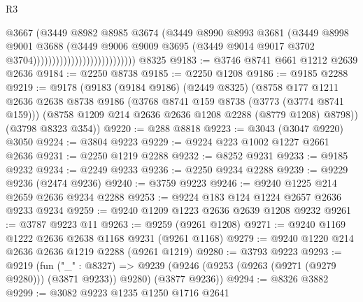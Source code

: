 \begin{lexlean}{R3}
\begin{coremodule}
                                                @3667
                                                (@3449
                                                  @8982
                                                  @8985
                                                  @3674
                                                  (@3449
                                                    @8990
                                                    @8993
                                                    @3681
                                                    (@3449
                                                      @8998
                                                      @9001
                                                      @3688
                                                      (@3449
                                                        @9006
                                                        @9009
                                                        @3695
                                                        (@3449
                                                          @9014
                                                          @9017
                                                          @3702
                                                          @3704)))))))))))))))))))))))))))
    @8325
@9183 := @3746 @8741 @661 @1212 @2639 @2636
@9184 := @2250 @8738
@9185 := @2250 @1208
@9186 := @9185 @2288
@9219 := @9178
    (@9183
      (@9184 @9186)
      (@2449 @8325)
      (@8758
        @177
        @1211
        @2636
        @2638
        @8738
        @9186
        (@3768 @8741 @159 @8738 (@3773 (@3774 @8741 @159)))
        (@8758 @1209 @214 @2636 @2636 @1208 @2288 (@8779 @1208) @8798))
      (@3798 @8323 @354))
@9220 := @288 @8818
@9223 := @3043 (@3047 @9220) @3050
@9224 := @3804 @9223
@9229 := @9224 @223 @1002 @1227 @2661 @2636
@9231 := @2250 @1219 @2288
@9232 := @8252 @9231
@9233 := @9185 @9232
@9234 := @2249 @9233
@9236 := @2250 @9234 @2288
@9239 := @9229 @9236 (@2474 @9236)
@9240 := @3759 @9223
@9246 := @9240 @1225 @214 @2659 @2636 @9234 @2288
@9253 := @9224 @183 @124 @1224 @2657 @2636 @9233 @9234
@9259 := @9240 @1209 @1223 @2636 @2639 @1208 @9232
@9261 := @3787 @9223 @11
@9263 := @9259 (@9261 @1208)
@9271 := @9240 @1169 @1222 @2636 @2638 @1168 @9231 (@9261 @1168)
@9279 := @9240 @1220 @214 @2636 @2636 @1219 @2288 (@9261 @1219)
@9280 := @3793 @9223
@9293 := @9219
    (fun ("_" : @8327) =>
    @9239 (@9246 (@9253 (@9263 (@9271 (@9279 @9280))) (@3871 @9233)) @9280) (@3877 @9236))
@9294 := @8326 @3882
@9299 := @3082 @9223 @1235 @1250 @1716 @2641

\end{coremodule}
\end{lexlean}
